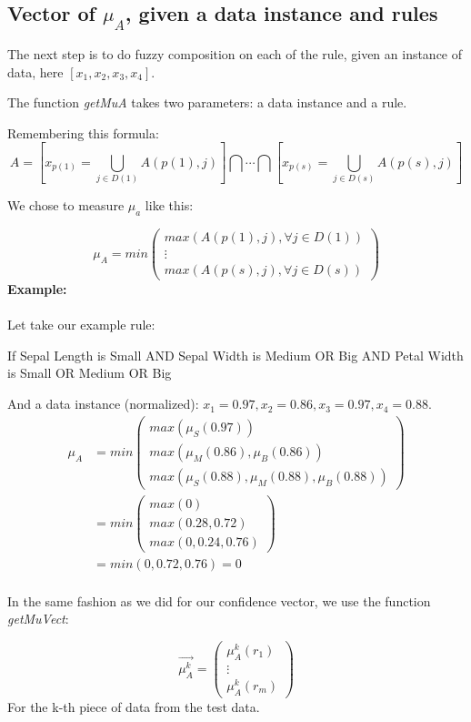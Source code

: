 \documentclass[a4paper,12pt]{article}
\begin{document}
\subsection{Vector of $\mu_A$, given a data instance and rules}

The next step is to do fuzzy composition on each of the rule, given an instance of data, here $[x_1,x_2,x_3,x_4]$.

The function \textit{getMuA} takes two parameters: a data instance and a rule.

Remembering this formula:
\[A=[x_{p(1)}=\bigcup_{j\in D(1)}A(p(1),j) ] \bigcap\cdots\bigcap[x_{p(s)}=\bigcup_{j\in D(s)}A(p(s),j)]\]

We chose to measure $\mu_a$ like this:

\[\mu_A=
min
\begin{pmatrix}
max(A(p(1),j),\forall j \in D(1))\\
\vdots \\
max(A(p(s),j),\forall j \in D(s))
\end{pmatrix}
    \]
\textbf{Example:}\\
\\
Let take our example rule:
\begin{center}
If Sepal Length is Small AND Sepal Width is Medium OR Big AND Petal Width is Small OR Medium OR Big
\end{center}
And a data instance (normalized): $x_1=0.97,x_2=0.86,x_3=0.97,x_4=0.88$.\\
\[
\begin{split}
\mu_A &= min
\begin{pmatrix}
max(\mu_S(0.97))\\
max(\mu_M(0.86),\mu_B(0.86))\\
max(\mu_S(0.88),\mu_M(0.88),\mu_B(0.88))
\end{pmatrix}\\
&= min
\begin{pmatrix}
max(0)\\
max(0.28,0.72)\\
max(0,0.24,0.76)
\end{pmatrix}\\
&= min(0,0.72,0.76) = 0
\end{split}
\]
\\

In the same fashion as we did for our confidence vector, we use the function \textit{getMuVect}:

\[
\vec{\mu_A^k}=
\begin{pmatrix}
\mu_A^k(r_1)\\
\vdots\\
\mu_A^k(r_m)
\end{pmatrix}
\]
For the k-th piece of data from the test data.
\end{document}
